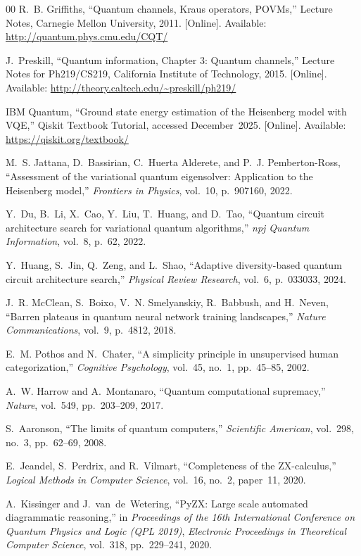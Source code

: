\documentclass[conference]{IEEEtran}
\begin{document}
\begin{thebibliography}{00}
R.~B. Griffiths, 
``Quantum channels, Kraus operators, POVMs,'' 
Lecture Notes, Carnegie Mellon University, 2011. 
[Online]. Available: \url{http://quantum.phys.cmu.edu/CQT/}

J.~Preskill, 
``Quantum information, Chapter 3: Quantum channels,'' 
Lecture Notes for Ph219/CS219, California Institute of Technology, 2015. 
[Online]. Available: \url{http://theory.caltech.edu/~preskill/ph219/}

IBM Quantum,
``Ground state energy estimation of the Heisenberg model with VQE,'' 
Qiskit Textbook Tutorial, accessed December~2025. 
[Online]. Available: \url{https://qiskit.org/textbook/}

M.~S. Jattana, D.~Bassirian, C.~Huerta Alderete, and P.~J. Pemberton-Ross,
``Assessment of the variational quantum eigensolver: Application to the Heisenberg model,'' 
\textit{Frontiers in Physics}, vol.~10, p.~907160, 2022.

Y.~Du, B.~Li, X.~Cao, Y.~Liu, T.~Huang, and D.~Tao,
``Quantum circuit architecture search for variational quantum algorithms,'' 
\textit{npj Quantum Information}, vol.~8, p.~62, 2022.

Y.~Huang, S.~Jin, Q.~Zeng, and L.~Shao,
``Adaptive diversity-based quantum circuit architecture search,'' 
\textit{Physical Review Research}, vol.~6, p.~033033, 2024.

J.~R. McClean, S.~Boixo, V.~N. Smelyanskiy, R.~Babbush, and H.~Neven,
``Barren plateaus in quantum neural network training landscapes,'' 
\textit{Nature Communications}, vol.~9, p.~4812, 2018.

E.~M. Pothos and N.~Chater,
``A simplicity principle in unsupervised human categorization,''
\textit{Cognitive Psychology}, vol.~45, no.~1, pp.~45--85, 2002.

A.~W. Harrow and A.~Montanaro, 
``Quantum computational supremacy,'' 
\textit{Nature}, vol.~549, pp.~203--209, 2017.

S.~Aaronson,
``The limits of quantum computers,'' 
\textit{Scientific American}, vol.~298, no.~3, pp.~62--69, 2008.

E.~Jeandel, S.~Perdrix, and R.~Vilmart,
``Completeness of the ZX-calculus,'' 
\textit{Logical Methods in Computer Science}, vol.~16, no.~2, paper~11, 2020.

A.~Kissinger and J.~van~de~Wetering,
``PyZX: Large scale automated diagrammatic reasoning,'' 
in \textit{Proceedings of the 16th International Conference on Quantum Physics and Logic (QPL 2019)}, 
\textit{Electronic Proceedings in Theoretical Computer Science}, vol.~318, pp.~229--241, 2020.


\end{thebibliography}
\end{document}
